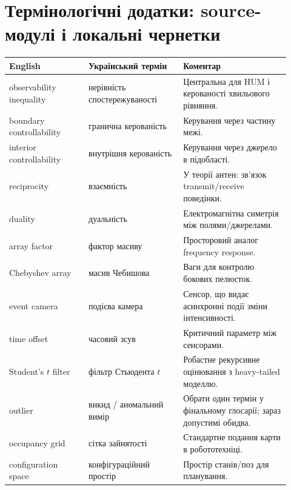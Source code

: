\chapter{Термінологічні додатки: source-модулі і локальні чернетки}

\begin{longtable}{L{0.26\linewidth}L{0.31\linewidth}L{0.35\linewidth}}
\toprule
English & Український термін & Коментар \\
\midrule
observability inequality & нерівність спостережуваності & Центральна для HUM і керованості хвильового рівняння. \\
boundary controllability & гранична керованість & Керування через частину межі. \\
interior controllability & внутрішня керованість & Керування через джерело в підобласті. \\
reciprocity & взаємність & У теорії антен: зв'язок transmit/receive поведінки. \\
duality & дуальність & Електромагнітна симетрія між полями/джерелами. \\
array factor & фактор масиву & Просторовий аналог frequency response. \\
Chebyshev array & масив Чебишова & Ваги для контролю бокових пелюсток. \\
event camera & подієва камера & Сенсор, що видає асинхронні події зміни інтенсивності. \\
time offset & часовий зсув & Критичний параметр між сенсорами. \\
Student's $t$ filter & фільтр Стьюдента $t$ & Робастне рекурсивне оцінювання з heavy-tailed моделлю. \\
outlier & викид / аномальний вимір & Обрати один термін у фінальному глосарії; зараз допустимі обидва. \\
occupancy grid & сітка зайнятості & Стандартне подання карти в робототехніці. \\
configuration space & конфігураційний простір & Простір станів/поз для планування. \\
\bottomrule
\end{longtable}
